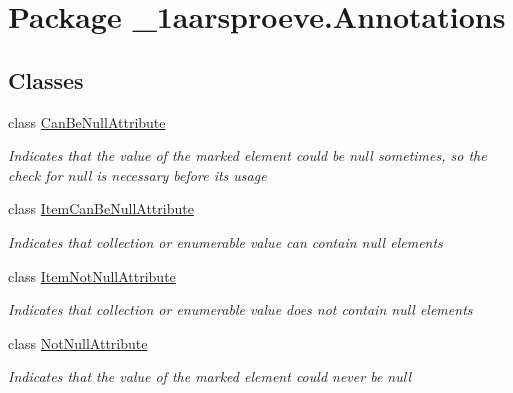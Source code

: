 \hypertarget{namespace__1aarsproeve_1_1_annotations}{}\section{Package \+\_\+1aarsproeve.\+Annotations}
\label{namespace__1aarsproeve_1_1_annotations}
\subsection*{Classes}
\begin{DoxyCompactItemize}
\item 
class \hyperlink{class__1aarsproeve_1_1_annotations_1_1_can_be_null_attribute}{Can\+Be\+Null\+Attribute}
\begin{DoxyCompactList}\small\item\em Indicates that the value of the marked element could be {\ttfamily null} sometimes, so the check for {\ttfamily null} is necessary before its usage \end{DoxyCompactList}\item 
class \hyperlink{class__1aarsproeve_1_1_annotations_1_1_item_can_be_null_attribute}{Item\+Can\+Be\+Null\+Attribute}
\begin{DoxyCompactList}\small\item\em Indicates that collection or enumerable value can contain null elements \end{DoxyCompactList}\item 
class \hyperlink{class__1aarsproeve_1_1_annotations_1_1_item_not_null_attribute}{Item\+Not\+Null\+Attribute}
\begin{DoxyCompactList}\small\item\em Indicates that collection or enumerable value does not contain null elements \end{DoxyCompactList}\item 
class \hyperlink{class__1aarsproeve_1_1_annotations_1_1_not_null_attribute}{Not\+Null\+Attribute}
\begin{DoxyCompactList}\small\item\em Indicates that the value of the marked element could never be {\ttfamily null} \end{DoxyCompactList}\end{DoxyCompactItemize}
